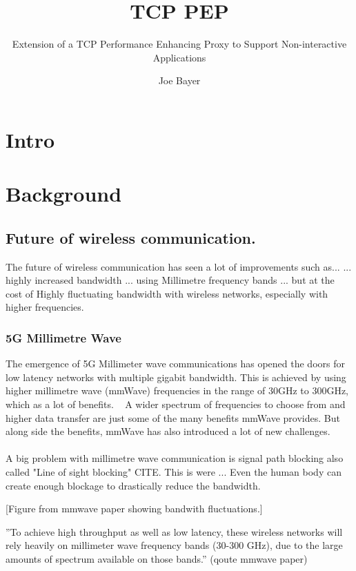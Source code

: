 \documentclass[a4paper,english, 11pt]{report}
\author{Joe Bayer}
\title{TCP PEP}
\subtitle{Extension of a TCP Performance Enhancing Proxy to
Support Non-interactive Applications}
\begin{document}
\uiomasterfp[program={Informatics: Programming and System Architecture}, supervisors={Michael Welzl\and Kristjon Ciko}]

\tableofcontents

\chapter{Intro}

\chapter{Background}

\section{Future of wireless communication.}
The future of wireless communication has seen a lot of improvements such as...
... highly increased bandwidth ... using Millimetre frequency bands ... but at the cost of Highly fluctuating bandwidth with wireless networks, especially with higher frequencies.\\ 

\subsection{5G Millimetre Wave}
The emergence of 5G Millimeter wave communications has opened the doors for low latency networks with multiple gigabit bandwidth. This is achieved by using higher millimetre wave (mmWave) frequencies in the range of 30GHz to 300GHz, which as a lot of benefits. ~\cite{Agrawal_Sharma_2016} A wider spectrum of frequencies to choose from and higher data transfer are just some of the many benefits mmWave provides. But along side the benefits, mmWave has also introduced a lot of new challenges.\\\\

A big problem with millimetre wave communication is signal path blocking also called "Line of sight blocking" CITE. This is were ...
Even the human body can create enough blockage to drastically reduce the bandwidth. 

[Figure from mmwave paper showing bandwith fluctuations.]

''To achieve high throughput as well as low latency, these
wireless networks will rely heavily on millimeter wave frequency bands (30-300 GHz), due to the large amounts of
spectrum available on those bands.'' (qoute mmwave paper)
\end{document}
